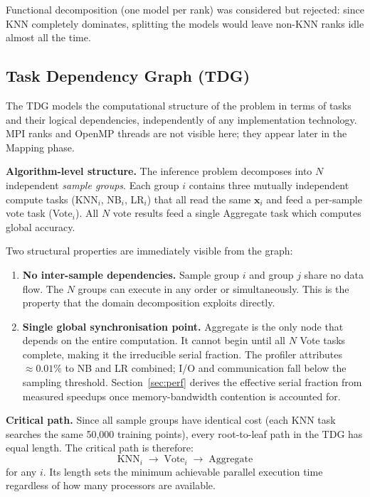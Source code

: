 \documentclass[12pt,a4paper]{article}
\begin{document}
Functional decomposition (one model per rank) was considered but rejected:
since KNN completely dominates, splitting the models would leave non-KNN ranks
idle almost all the time.

\subsection{Task Dependency Graph (TDG)}

The TDG models the computational structure of the problem in terms of
tasks and their logical dependencies, independently of any implementation
technology. MPI ranks and OpenMP threads are not visible here; they appear
later in the Mapping phase.

\textbf{Algorithm-level structure.}
The inference problem decomposes into $N$ independent \emph{sample groups}.
Each group $i$ contains three mutually independent compute tasks
(KNN$_i$, NB$_i$, LR$_i$) that all read the same $\mathbf{x}_i$ and feed
a per-sample vote task (Vote$_i$). All $N$ vote results feed a single
Aggregate task which computes global accuracy.

Two structural properties are immediately visible from the graph:

\begin{enumerate}
  \item \textbf{No inter-sample dependencies.} Sample group $i$ and group
        $j$ share no data flow. The $N$ groups can execute in any order or
        simultaneously. This is
        the property that the domain decomposition exploits directly.
  \item \textbf{Single global synchronisation point.} Aggregate is the only
        node that depends on the entire computation. It cannot begin until
        all $N$ Vote tasks complete, making it the irreducible serial
        fraction. The profiler attributes $\approx 0.01\%$ to NB and LR combined;
        I/O and communication fall below the sampling threshold.
        Section~\ref{sec:perf} derives the effective serial fraction from
        measured speedups once memory-bandwidth contention is accounted for.
\end{enumerate}

\textbf{Critical path.}
Since all sample groups have identical cost (each KNN task searches the
same 50{,}000 training points), every root-to-leaf path in the TDG has
equal length. The critical path is therefore:
\[
  \text{KNN}_i \;\longrightarrow\; \text{Vote}_i \;\longrightarrow\;
  \text{Aggregate}
\]
for any $i$. Its length sets the minimum achievable parallel execution time
regardless of how many processors are available.
\end{document}
